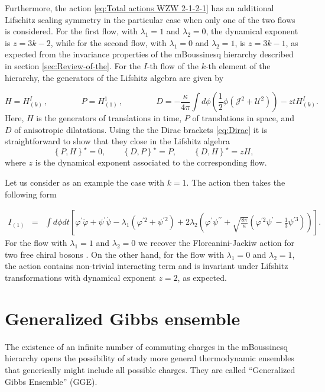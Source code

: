 \documentclass[letterpaper,11pt,oneside]{book}
\begin{document}
Furthermore, the action \eqref{eq:Total actions WZW 2-1-2-1} has
an additional Lifschitz scaling symmetry in the particular case when
only one of the two flows is considered. For the first flow, with
$\lambda_{1}=1$ and $\lambda_{2}=0$, the dynamical exponent is $z=3k-2$,
while for the second flow, with $\lambda_{1}=0$ and $\lambda_{2}=1$,
is $z=3k-1$, as expected from the invariance properties of the mBoussinesq
hierarchy described in section \ref{sec:Review-of-the}. For the $I$-th
flow of the $k$-th element of the hierarchy, the generators of the
Lifshitz algebra are given by

\[
H=H_{\left(k\right)}^{I}\,,\qquad\qquad P=H_{\left(1\right)}^{1}\,,\qquad\qquad D=-\frac{\kappa}{4\pi}\int d\phi\left(\frac{1}{2}\phi\left(\mathcal{J}^{2}+\mathcal{U}^{2}\right)\right)-ztH_{\left(k\right)}^{I}.
\]
Here, $H$ is the generators of translations in time, $P$ of translations
in space, and $D$ of anisotropic dilatations. Using the the Dirac
brackets \eqref{eq:Dirac} it is straightforward to show that they
close in the Lifshitz algebra
\[
\left\{ P,H\right\} ^{\star}=0,\qquad\left\{ D,P\right\} ^{\star}=P,\qquad\left\{ D,H\right\} ^{\star}=zH,
\]
where $z$ is the dynamical exponent associated to the corresponding
flow.

Let us consider as an example the case with $k=1$. The action then
takes the following form

\begin{eqnarray*}
	I_{\left(1\right)} & = & \int d\phi dt\left[\varphi^{\prime}\dot{\varphi}+\psi^{\prime}\dot{\psi}-\lambda_{1}\left(\varphi^{\prime2}+\psi^{\prime2}\right)+2\lambda_{2}\left(\varphi^{\prime}\psi^{\prime\prime}+\sqrt{\frac{8\pi}{\kappa}}\left(\varphi^{\prime2}\psi^{\prime}-\frac{1}{3}\psi^{\prime3}\right)\right)\right].
\end{eqnarray*}
For the flow with $\lambda_{1}=1$ and $\lambda_{2}=0$ we recover
the Floreanini-Jackiw action for two free chiral bosons \cite{Floreanini:1987as}.
On the other hand, for the flow with $\lambda_{1}=0$ and $\lambda_{2}=1$,
the action contains non-trivial interacting term and is invariant
under Lifshitz transformations with dynamical exponent $z=2$, as
expected.

\section{Generalized Gibbs ensemble\label{sec:Generalized Gibbs}}

The existence of an infinite number of commuting charges in the mBoussinesq
hierarchy opens the possibility of study more general thermodynamic
ensembles that generically might include all possible charges. They
are called ``Generalized Gibbs Ensemble'' (GGE).
\end{document}
